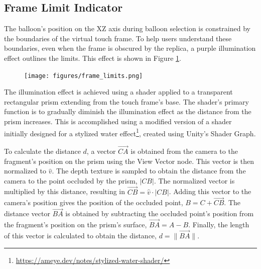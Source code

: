     
    
    \subsection{Frame Limit Indicator} \label{sec:frame_limits}

        The balloon's position on the XZ axis during balloon selection is constrained by the boundaries of the virtual touch frame. To help users understand these boundaries, even when the frame is obscured by the replica, a purple illumination effect outlines the limits. This effect is shown in Figure \ref{fig:frame_limits}.

        \begin{figure}[h!]
            \centering
            \texttt{[image: figures/frame\_limits.png]}
            \label{fig:frame_limits}
        \end{figure}
    
        The illumination effect is achieved using a shader applied to a transparent rectangular prism extending from the touch frame's base. The shader's primary function is to gradually diminish the illumination effect as the distance from the prism increases. This is accomplished using a modified version of a shader initially designed for a stylized water effect\footnote{\url{https://ameye.dev/notes/stylized-water-shader/}}, created using Unity's Shader Graph.
        
        To calculate the distance \( d \), a vector \(\vec{CA}\) is obtained from the camera to the fragment's position on the prism using the View Vector node. This vector is then normalized to \(\hat{v}\). The depth texture is sampled to obtain the distance from the camera to the point occluded by the prism, \(|CB|\). The normalized vector is multiplied by this distance, resulting in \(\vec{CB} = \hat{v} \cdot |CB|\). Adding this vector to the camera's position gives the position of the occluded point, \( B = C + \vec{CB} \). The distance vector \(\vec{BA}\) is obtained by subtracting the occluded point's position from the fragment's position on the prism's surface, \(\vec{BA} = A - B\). Finally, the length of this vector is calculated to obtain the distance, \( d = \|\vec{BA}\| \).
        
